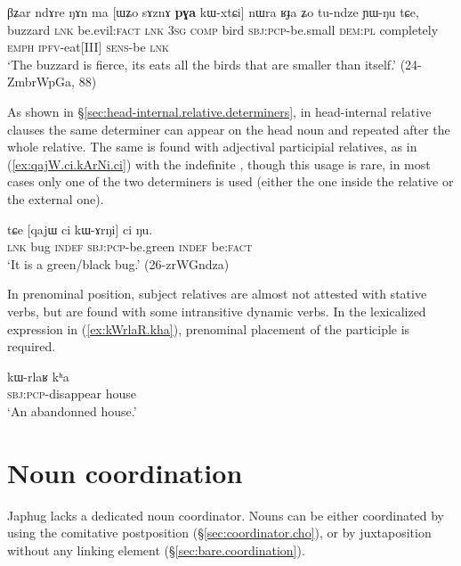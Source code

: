 \begin{exe}
\ex \label{ex:WZo.sAznA.pGa.kWxtCi}
\gll βʑar ndɤre ŋɤn ma [ɯʑo sɤznɤ \textbf{pɣa} kɯ-xtɕi] nɯra ʁɟa ʑo tu-ndze ɲɯ-ŋu tɕe, \\
buzzard \textsc{lnk} be.evil:\textsc{fact} \textsc{lnk} \textsc{3sg} \textsc{comp} bird \textsc{sbj}:\textsc{pcp}-be.small \textsc{dem}:\textsc{pl} completely \textsc{emph}  \textsc{ipfv}-eat[III] \textsc{sens}-be \textsc{lnk} \\
\glt `The buzzard is fierce, its eats all the birds that are smaller than itself.' (24-ZmbrWpGa, 88)
\end{exe}

As shown in §\ref{sec:head-internal.relative.determiners}, in head-internal relative clauses the same determiner can appear on the head noun and repeated after the whole relative. The same is found with adjectival participial relatives, as in (\ref{ex:qajW.ci.kArNi.ci}) with the indefinite , though this usage is rare, in most cases only one of the two determiners is used (either the one inside the relative or the external one).

\begin{exe}
\ex \label{ex:qajW.ci.kArNi.ci}
\gll tɕe [qajɯ ci kɯ-ɤrŋi] ci ŋu. \\
\textsc{lnk} bug \textsc{indef} \textsc{sbj}:\textsc{pcp}-be.green \textsc{indef} be:\textsc{fact} \\
\glt `It is a green/black bug.' (26-zrWGndza)
\end{exe}

In prenominal position, subject relatives are almost not attested with stative verbs, but are found with some intransitive dynamic verbs. In the lexicalized expression in (\ref{ex:kWrlaR.kha}), prenominal placement of the participle   is required.

\begin{exe}
\ex \label{ex:kWrlaR.kha}
\gll kɯ-rlaʁ kʰa \\
\textsc{sbj}:\textsc{pcp}-disappear house \\
\glt `An abandonned house.' 
\end{exe}

 \section{Noun coordination}
Japhug lacks a dedicated noun coordinator. Nouns can be either coordinated by using the comitative postposition  (§\ref{sec:coordinator.cho}), or by  juxtaposition without any linking element (§\ref{sec:bare.coordination}). 

